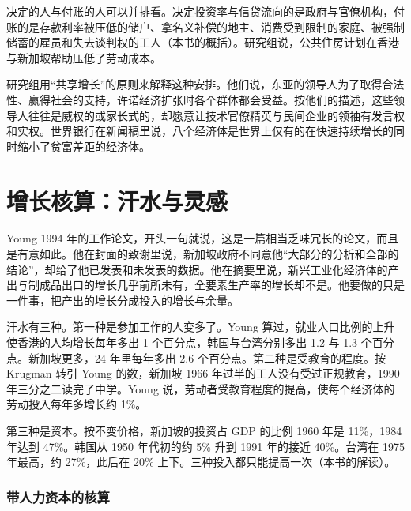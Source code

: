 决定的人与付账的人可以并排看。决定投资率与信贷流向的是政府与官僚机构，付账的是存款利率被压低的储户、拿名义补偿的地主、消费受到限制的家庭、被强制储蓄的雇员和失去谈判权的工人（本书的概括）。研究组说，公共住房计划在香港与新加坡帮助压低了劳动成本\cite{worldbank1993}。

研究组用“共享增长”的原则来解释这种安排。他们说，东亚的领导人为了取得合法性、赢得社会的支持，许诺经济扩张时各个群体都会受益\cite{worldbank1993}。按他们的描述，这些领导人往往是威权的或家长式的，却愿意让技术官僚精英与民间企业的领袖有发言权和实权\cite{worldbank1993}。世界银行在新闻稿里说，八个经济体是世界上仅有的在快速持续增长的同时缩小了贫富差距的经济体\cite{worldbank1993news}。

\section{增长核算：汗水与灵感}\label{sec:eastasia-accounting}

Young 1994 年的工作论文，开头一句就说，这是一篇相当乏味冗长的论文，而且是有意如此\cite{young1994}。他在封面的致谢里说，新加坡政府不同意他“大部分的分析和全部的结论”，却给了他已发表和未发表的数据\cite{young1994}。他在摘要里说，新兴工业化经济体的产出与制成品出口的增长几乎前所未有，全要素生产率的增长却不是\cite{young1994}。他要做的只是一件事，把产出的增长分成投入的增长与余量。

汗水有三种。第一种是参加工作的人变多了。Young 算过，就业人口比例的上升使香港的人均增长每年多出 1 个百分点，韩国与台湾分别多出 1.2 与 1.3 个百分点\cite{young1994}。新加坡更多，24 年里每年多出 2.6 个百分点\cite{young1994}。第二种是受教育的程度。按 Krugman 转引 Young 的数，新加坡 1966 年过半的工人没有受过正规教育，1990 年三分之二读完了中学\cite{krugman1994}。Young 说，劳动者受教育程度的提高，使每个经济体的劳动投入每年多增长约 1\%\cite{young1994}。

第三种是资本。按不变价格，新加坡的投资占 GDP 的比例 1960 年是 11\%，1984 年达到 47\%\cite{young1994}。韩国从 1950 年代初的约 5\% 升到 1991 年的接近 40\%\cite{young1994}。台湾在 1975 年最高，约 27\%，此后在 20\% 上下\cite{young1994}。三种投入都只能提高一次（本书的解读）。

\subsubsection{带人力资本的核算}

